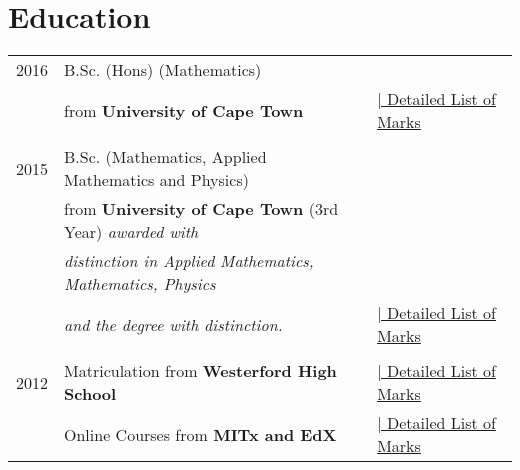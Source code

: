 
\section{Education}

\begin{tabular}{R{3cm}|ll}
  2016& B.Sc. (Hons) (Mathematics)&\\ &\hspace{20pt}from \textbf{University of Cape Town} &\hyperlink{hongrds}{\hfill | \footnotesize Detailed List of Marks}\\
                &&\\
  2015& B.Sc. (Mathematics, Applied Mathematics and Physics)&\\ 
      &\hspace{20pt}from \textbf{University of Cape Town} (3rd Year) \emph{awarded with}&\\
      &\hspace{20pt}\emph{distinction in Applied Mathematics, Mathematics, Physics}&\\
      &\hspace{20pt}\emph{and the degree with distinction. }&\hyperlink{unigrds}{\hfill | \footnotesize Detailed List of Marks}\\
&&\\
  2012 & Matriculation from \textbf{Westerford High School}&\hyperlink{matgrds}{\hfill | \footnotesize Detailed List of Marks}\\
& Online Courses from \textbf{MITx and EdX} &\hyperlink{ongrds}{\hfill | \footnotesize Detailed List of Marks}\\
\end{tabular}


